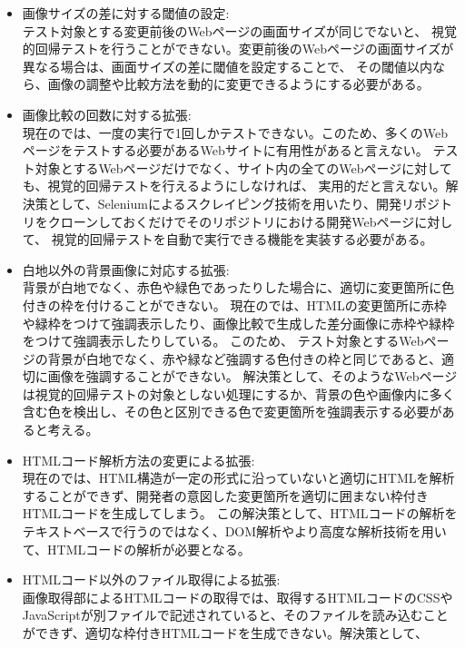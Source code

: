 \begin{itemize}
      \item 画像サイズの差に対する閾値の設定:\\
            テスト対象とする変更前後のWebページの画面サイズが同じでないと、
            視覚的回帰テストを行うことができない。変更前後のWebページの画面サイズが異なる場合は、画面サイズの差に閾値を設定することで、
            その閾値以内なら、画像の調整や比較方法を動的に変更できるようにする必要がある。
      \item 画像比較の回数に対する拡張:\\
            現在の\toolName では、一度の実行で1回しかテストできない。このため、多くのWebページをテストする必要があるWebサイトに有用性があると言えない。
            テスト対象とするWebページだけでなく、サイト内の全てのWebページに対しても、視覚的回帰テストを行えるようにしなければ、
            実用的だと言えない。解決策として、Seleniumによるスクレイピング技術を用いたり、開発リポジトリをクローンしておくだけでそのリポジトリにおける開発Webページに対して、
            視覚的回帰テストを自動で実行できる機能を実装する必要がある。
      \item 白地以外の背景画像に対応する拡張:\\
            背景が白地でなく、赤色や緑色であったりした場合に、適切に変更箇所に色付きの枠を付けることができない。
            現在の\toolName では、HTMLの変更箇所に赤枠や緑枠をつけて強調表示したり、画像比較で生成した差分画像に赤枠や緑枠をつけて強調表示したりしている。
            このため、
            テスト対象とするWebページの背景が白地でなく、赤や緑など強調する色付きの枠と同じであると、適切に画像を強調することができない。
            解決策として、そのようなWebページは視覚的回帰テストの対象としない処理にするか、背景の色や画像内に多く含む色を検出し、その色と区別できる色で変更箇所を強調表示する必要があると考える。
      \item HTMLコード解析方法の変更による拡張:\\
            現在の\toolName では、HTML構造が一定の形式に沿っていないと適切にHTMLを解析することができず、開発者の意図した変更箇所を適切に囲まない枠付きHTMLコードを生成してしまう。
            この解決策として、HTMLコードの解析をテキストベースで行うのではなく、DOM解析やより高度な解析技術を用いて、HTMLコードの解析が必要となる。
      \item HTMLコード以外のファイル取得による拡張:\\
            画像取得部によるHTMLコードの取得では、取得するHTMLコードのCSSやJavaScriptが別ファイルで記述されていると、そのファイルを読み込むことができず、適切な枠付きHTMLコードを生成できない。解決策として、

\end{itemize}
